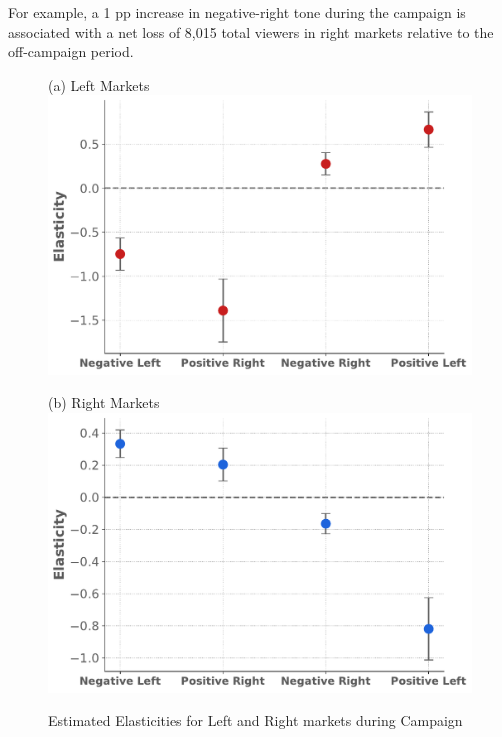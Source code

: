 \documentclass[12pt]{article}
\begin{document}
	  For example, a 1 pp increase in negative-right tone during the campaign is associated with a net loss of 8,015 total viewers in right markets relative to  the off-campaign period.
	
	

	
	\begin{figure}[!htbp]
		\centering
		\caption{Estimated Elasticities for Left and Right markets during Campaign}
\label{fig:elasticities_campaign}
		\vspace{0.5em} %
		
		\begin{minipage}{0.45\textwidth}
			\centering
			(a) Left Markets\\
			\includegraphics[width=\linewidth]{figures/elasticities_left_campaign}
		\end{minipage}
		\hfill
		\begin{minipage}{0.45\textwidth}
			\centering
			\vspace{1.5em}
			(b) Right Markets \\
						\includegraphics[width=\linewidth]{figures/elasticities_right_campaign}
			\label{fig:2figsA}
		\end{minipage}
		

\end{figure}
\end{document}
